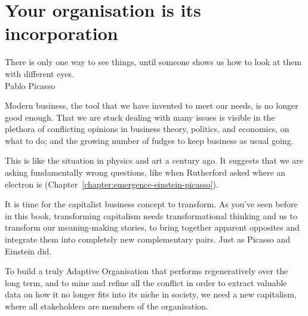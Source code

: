 ﻿\chapter{Your organisation is its incorporation}
\label{chapter:who-is-your-organisation-incorporation}


\begin{chapterquotation}
There is only one way to see things, until someone shows us how to look at them with different eyes.\\
\raggedleft\textemdash Pablo Picasso
\end{chapterquotation}


Modern business, the tool that we have invented to meet our needs, is no longer good enough. That we are stuck dealing with many issues is visible in the plethora of conflicting opinions in business theory, politics, and economics, on what to do; and the growing number of fudges to keep business as usual going.


This is like the situation in physics and art a century ago. It suggests that we are asking fundamentally wrong questions, like when Rutherford asked where an electron is (Chapter~\ref{chapter:emergence-einstein-picasso}).


It is time for the capitalist business concept to transform. As you've seen before in this book, transforming capitalism needs transformational thinking and us to transform our meaning\hyp{}making stories, to bring together apparent opposites and integrate them into completely new complementary pairs. Just as Picasso and Einstein did.


To build a truly Adaptive Organisation that performs regeneratively over the long term, and to mine and refine all the conflict in order to extract valuable data on how it no longer fits into its niche in society, we need a new capitalism, where all stakeholders are members of the organisation. 


